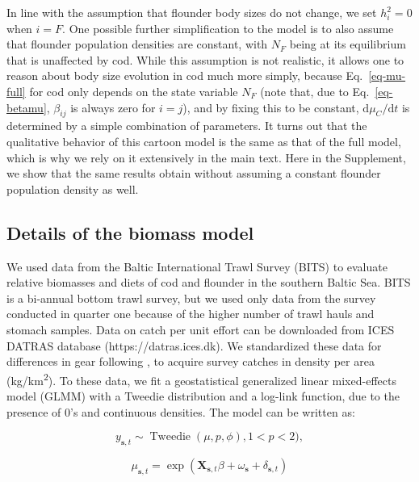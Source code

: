 \documentclass[9pt,twoside,lineno]{pnas-new}
\newcommand{\ud}{\text{d}}
\begin{document}
In line with the assumption that flounder body sizes do not change, we set $h_i^2 = 0$ when $i = F$. One possible further simplification to the model is to also assume that flounder population densities are constant, with $N_F$ being at its equilibrium that is unaffected by cod. While this assumption is not realistic, it allows one to reason about body size evolution in cod much more simply, because Eq.~\ref{eq-mu-full} for cod only depends on the state variable $N_F$ (note that, due to Eq.~\ref{eq-betamu}, $\beta_{ij}$ is always zero for $i = j$), and by fixing this to be constant, $\ud \mu_C / \ud t$ is determined by a simple combination of parameters. It turns out that the qualitative behavior of this cartoon model is the same as that of the full model, which is why we rely on it extensively in the main text. Here in the Supplement, we show that the same results obtain without assuming a constant flounder population density as well.


\newpage
\subsection*{Details of the biomass model} \label{sec:si_biomass}

We used data from the Baltic International Trawl Survey (BITS) to evaluate relative biomasses and diets of cod and flounder in the southern Baltic Sea. BITS is a bi-annual bottom trawl survey, but we used only data from the survey conducted in quarter one because of the higher number of trawl hauls and stomach samples. Data on catch per unit effort can be downloaded from ICES DATRAS database (https://datras.ices.dk). We standardized these data for differences in gear following \cite{Orio2017, Lindmark2023}, to acquire survey catches in density per area (kg/km\textsuperscript{2}). To these data, we fit a geostatistical generalized linear mixed-effects model (GLMM) with a Tweedie distribution \citep{Tweedie1984, Shono2008, Anderson2019} and a log-link function, due to the presence of 0's and continuous densities. The model can be written as:

\begin{equation}
    \label{eq:si_spatiotemporal1}
    y_{\boldsymbol{s}, t} \sim \operatorname{Tweedie} (\mu, p, \phi), 1<p<2),
\end{equation}

\begin{equation}
    \label{eq:si_spatiotemporal2}
    \mu_{{\boldsymbol{s}, t}}= \exp (\boldsymbol{X}_{\boldsymbol{s}, t}\beta + \omega_{\boldsymbol{s}} + \delta_{\boldsymbol{s}, t})
\end{equation}
\end{document}
